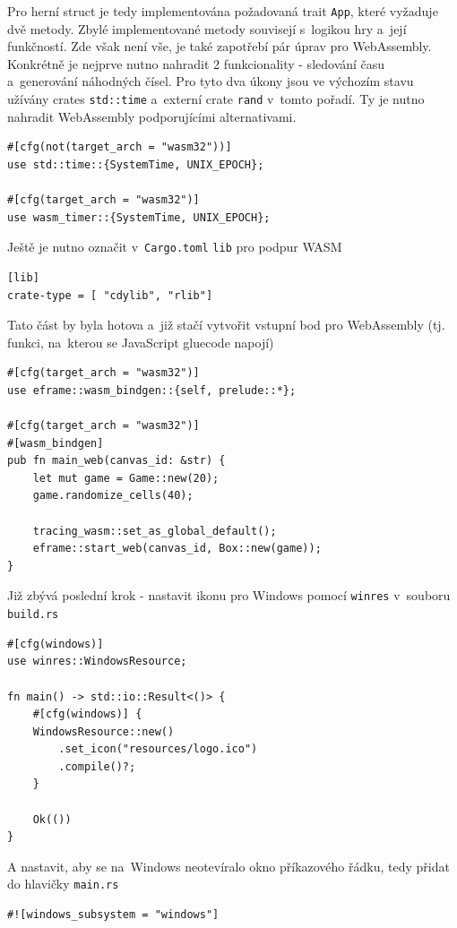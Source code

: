 \documentclass[a4paper, 12pt]{article} %
\newcommand{\rust}[1]{\texttt{#1}}
\begin{document}
		Pro herní struct je tedy implementována požadovaná trait \rust{App}, které vyžaduje dvě metody. Zbylé implementované metody souvisejí s~logikou hry a~její funkčností. Zde však není vše, je také zapotřebí pár úprav pro WebAssembly. Konkrétně je nejprve nutno nahradit 2 funkcionality - sledování času a~generování náhodných čísel. Pro tyto dva úkony jsou ve výchozím stavu užívány crates \rust{std::time} a~externí crate \rust{rand} v~tomto pořadí. Ty je nutno nahradit WebAssembly podporujícími alternativami.
		\begin{verbatim}
#[cfg(not(target_arch = "wasm32"))]
use std::time::{SystemTime, UNIX_EPOCH};

#[cfg(target_arch = "wasm32")]
use wasm_timer::{SystemTime, UNIX_EPOCH};
		\end{verbatim}
		
		Ještě je nutno označit v~\texttt{Cargo.toml} \texttt{lib} pro podpur WASM
		\begin{verbatim}
[lib]
crate-type = [ "cdylib", "rlib"]
		\end{verbatim}
		
		Tato část by byla hotova a~již stačí vytvořit vstupní bod pro WebAssembly (tj. funkci, na~kterou se JavaScript gluecode napojí)
		\begin{verbatim}
#[cfg(target_arch = "wasm32")]
use eframe::wasm_bindgen::{self, prelude::*};

#[cfg(target_arch = "wasm32")]
#[wasm_bindgen]
pub fn main_web(canvas_id: &str) {
	let mut game = Game::new(20);
	game.randomize_cells(40);

	tracing_wasm::set_as_global_default();
	eframe::start_web(canvas_id, Box::new(game));
}
		\end{verbatim}
		
		Již zbývá poslední krok - nastavit ikonu pro Windows pomocí \rust{winres} v~souboru \texttt{build.rs}
		\begin{verbatim}
#[cfg(windows)]
use winres::WindowsResource;

fn main() -> std::io::Result<()> {
	#[cfg(windows)] {
	WindowsResource::new()
		.set_icon("resources/logo.ico")
		.compile()?;
	}

	Ok(())
}
		\end{verbatim}
		
		A nastavit, aby se na~Windows neotevíralo okno příkazového řádku, tedy přidat do hlavičky \rust{main.rs}
		\begin{verbatim}
#![windows_subsystem = "windows"]
		\end{verbatim}
\end{document}

